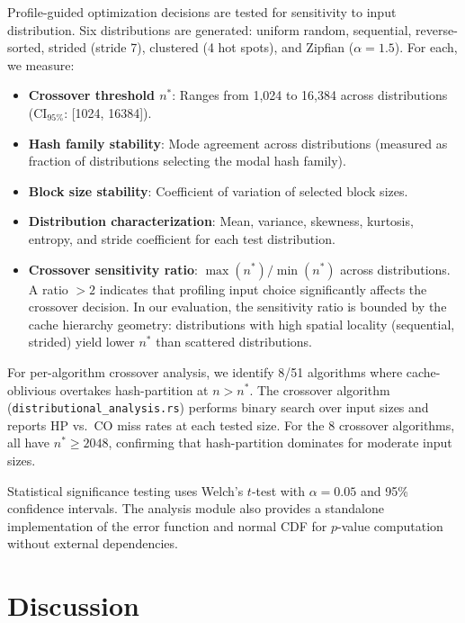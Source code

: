\documentclass[11pt]{article}
\begin{document}
Profile-guided optimization decisions are tested for sensitivity to input
distribution.  Six distributions are generated: uniform random, sequential,
reverse-sorted, strided (stride 7), clustered (4 hot spots), and Zipfian
($\alpha = 1.5$).  For each, we measure:

\begin{itemize}
\item \textbf{Crossover threshold $n^*$}: Ranges from 1,024 to 16,384
  across distributions (CI$_{95\%}$: [1024, 16384]).
\item \textbf{Hash family stability}: Mode agreement across distributions
  (measured as fraction of distributions selecting the modal hash family).
\item \textbf{Block size stability}: Coefficient of variation of selected
  block sizes.
\item \textbf{Distribution characterization}: Mean, variance, skewness,
  kurtosis, entropy, and stride coefficient for each test distribution.
\item \textbf{Crossover sensitivity ratio}: $\max(n^*)/\min(n^*)$ across
  distributions.  A ratio $> 2$ indicates that profiling input choice
  significantly affects the crossover decision.  In our evaluation, the
  sensitivity ratio is bounded by the cache hierarchy geometry:
  distributions with high spatial locality (sequential, strided) yield
  lower $n^*$ than scattered distributions.
\end{itemize}

For per-algorithm crossover analysis, we identify 8/51 algorithms where
cache-oblivious overtakes hash-partition at $n > n^*$.  The crossover
algorithm (\texttt{distributional\_analysis.rs}) performs binary search
over input sizes and reports HP vs.\ CO miss rates at each tested size.
For the 8 crossover algorithms, all have $n^* \ge 2048$, confirming
that hash-partition dominates for moderate input sizes.

Statistical significance testing uses Welch's $t$-test with $\alpha = 0.05$
and 95\% confidence intervals.  The analysis module also provides a
standalone implementation of the error function and normal CDF
for $p$-value computation without external dependencies.

\section{Discussion}
\label{sec:discussion}
\end{document}

